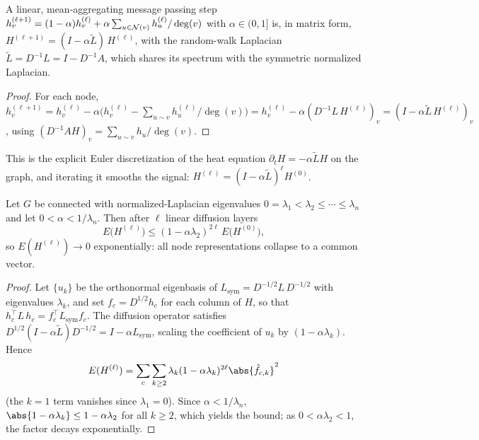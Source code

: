 \begin{proposition}
\label{prop:graphs:diffusion}
A linear, mean-aggregating message passing step
$h_v^{(\ell+1)} = (1-\alpha) h_v^{(\ell)} + \alpha \sum_{u \in \mathcal{N}(v)}
h_u^{(\ell)}/\deg(v)$ with $\alpha \in (0,1]$ is, in matrix form,
$H^{(\ell+1)} = (I - \alpha \tilde L)\, H^{(\ell)}$, with the random-walk
Laplacian $\tilde L = D^{-1} L = I - D^{-1} A$, which shares its spectrum with the
symmetric normalized Laplacian.
\end{proposition}

\begin{proof}
For each node,
$h_v^{(\ell+1)} = h_v^{(\ell)} - \alpha\big(h_v^{(\ell)}
- \sum_{u \sim v} h_u^{(\ell)}/\deg(v)\big)
= h_v^{(\ell)} - \alpha (D^{-1} L\, H^{(\ell)})_v
= (I - \alpha\tilde L\, H^{(\ell)})_v$, using
$(D^{-1} A H)_v = \sum_{u \sim v} h_u/\deg(v)$.
\end{proof}

This is the explicit Euler discretization of the heat equation
$\partial_t H = -\alpha \tilde L H$ on the graph, and iterating it smooths the
signal: $H^{(\ell)} = (I - \alpha\tilde L)^\ell H^{(0)}$.

\begin{theorem}
\label{thm:graphs:oversmoothing}
Let $G$ be connected with normalized-Laplacian eigenvalues
$0 = \lambda_1 < \lambda_2 \le \cdots \le \lambda_n$ and let
$0 < \alpha < 1/\lambda_n$. Then after $\ell$ linear diffusion layers
\[
  E\big(H^{(\ell)}\big) \le (1 - \alpha \lambda_2)^{2\ell}\, E\big(H^{(0)}\big),
\]
so $E(H^{(\ell)}) \to 0$ exponentially: all node representations collapse to a
common vector.
\end{theorem}

\begin{proof}
Let $\{u_k\}$ be the orthonormal eigenbasis of
$L_{\mathrm{sym}} = D^{-1/2} L\, D^{-1/2}$ with eigenvalues $\lambda_k$, and set
$f_c = D^{1/2} h_c$ for each column of $H$, so that
$h_c^\top L\, h_c = f_c^\top L_{\mathrm{sym}} f_c$. The diffusion operator
satisfies $D^{1/2}(I - \alpha\tilde L)D^{-1/2} = I - \alpha L_{\mathrm{sym}}$,
scaling the coefficient of $u_k$ by $(1 - \alpha\lambda_k)$. Hence
\[
  E(H^{(\ell)}) = \sum_c \sum_{k \ge 2}
    \lambda_k (1-\alpha\lambda_k)^{2\ell} \abs{\hat f_{c,k}}^2
\]
(the $k=1$ term vanishes since $\lambda_1 = 0$). Since $\alpha < 1/\lambda_n$,
$\abs{1-\alpha\lambda_k} \le 1 - \alpha\lambda_2$ for all $k \ge 2$, which yields
the bound; as $0 < \alpha\lambda_2 < 1$, the factor decays exponentially.
\end{proof}

